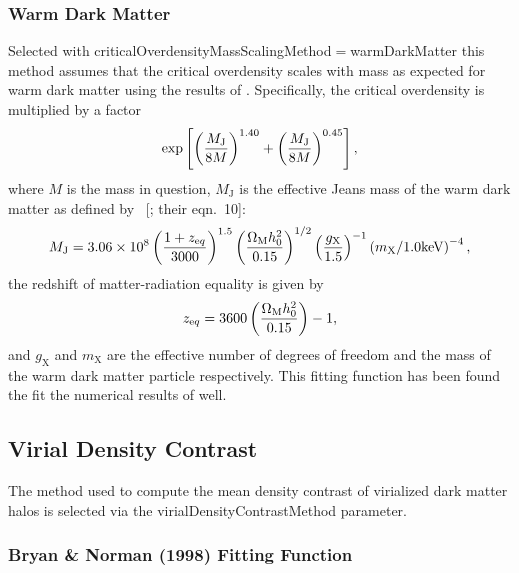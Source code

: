 \subsubsection{Warm Dark Matter}

Selected with {\normalfont \ttfamily criticalOverdensityMassScalingMethod}$=${\normalfont \ttfamily warmDarkMatter} this method assumes that the critical overdensity scales with mass as expected for warm dark matter using the results of \cite{barkana_constraints_2001}. Specifically, the critical overdensity is multiplied by a factor
\begin{equation}
 \exp\left[ \left({M_{\mathrm J} \over 8 M}\right)^{1.40}+\left({M_{\mathrm J} \over 8 M}\right)^{0.45} \right],
\end{equation}
where $M$ is the mass in question, $M_{\mathrm J}$ is the effective Jeans mass of the warm dark matter as defined by \citeauthor{barkana_constraints_2001}~[\citeyear{barkana_constraints_2001}; their eqn.~10]:
\begin{equation}
M_{\mathrm J} =  3.06 \times 10^8 \left( {1+z_{\mathrm eq} \over 3000}\right)^{1.5} \left({\Omega_{\mathrm M} h_0^2 \over 0.15}\right)^{1/2} \left({g_{\mathrm X} \over 1.5} \right)^{-1} \left({m_{\mathrm X}/1.0\hbox{keV}}\right)^{-4},
\end{equation}
the redshift of matter-radiation equality is given by
\begin{equation}
z_{\mathrm eq} = 3600 \left({\Omega_{\mathrm M} h_0^2 \over 0.15}\right)-1,
\end{equation}
and $g_{\mathrm X}$ and $m_{\mathrm X}$ are the effective number of degrees of freedom and the mass of the warm dark matter particle respectively. This fitting function has been found the fit the numerical results of \cite{barkana_constraints_2001} well.

\subsection{Virial Density Contrast}\label{sec:VirialDensityConstrast}

The method used to compute the mean density contrast of virialized dark matter halos is selected via the {\normalfont \ttfamily virialDensityContrastMethod} parameter.

\subsubsection{Bryan \& Norman (1998) Fitting Function}

